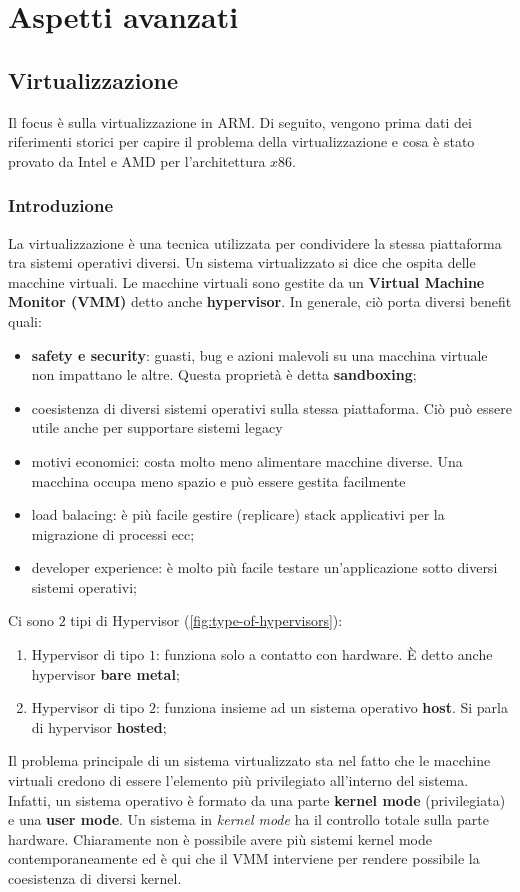 \documentclass{article}
\begin{document}
\clearpage
\section{Aspetti avanzati}
\subsection{Virtualizzazione}\label{sec:virtualization}
Il focus è sulla virtualizzazione in ARM. Di seguito, vengono prima dati dei riferimenti storici per capire il problema della virtualizzazione e cosa è stato provato da Intel e AMD per l'architettura $x86$.
\subsubsection{Introduzione}
La virtualizzazione è una tecnica utilizzata per condividere la stessa piattaforma tra sistemi operativi diversi. Un sistema virtualizzato si dice che ospita delle macchine virtuali. Le macchine virtuali sono gestite da un \textbf{Virtual Machine Monitor (VMM)} detto anche \textbf{hypervisor}.
In generale, ciò porta diversi benefit quali:
\begin{itemize}
  \item \textbf{safety e security}: guasti, bug e azioni malevoli su una macchina virtuale non impattano le altre. Questa proprietà è detta \textbf{sandboxing};
  \item coesistenza di diversi sistemi operativi sulla stessa piattaforma. Ciò può essere utile anche per supportare sistemi legacy
  \item motivi economici: costa molto meno alimentare macchine diverse. Una macchina occupa meno spazio e può essere gestita facilmente
  \item load balacing: è più facile gestire (replicare) stack applicativi per la migrazione di processi ecc; 
  \item developer experience: è molto più facile testare un'applicazione sotto diversi sistemi operativi;
\end{itemize}

Ci sono $2$ tipi di Hypervisor (\cref{fig:type-of-hypervisors}):
\begin{enumerate}
  \item Hypervisor di tipo $1$: funziona solo a contatto con hardware. È detto anche hypervisor \textbf{bare metal};
  \item Hypervisor di tipo $2$: funziona insieme ad un sistema operativo \textbf{host}. Si parla di hypervisor \textbf{hosted};
\end{enumerate}
Il problema principale di un sistema virtualizzato sta nel fatto che le macchine virtuali credono di essere l'elemento più privilegiato all'interno del sistema. Infatti, un sistema operativo è formato da una parte \textbf{kernel mode} (privilegiata) e una \textbf{user mode}. Un sistema in \textit{kernel mode} ha il controllo totale sulla parte hardware. Chiaramente non è possibile avere più sistemi kernel mode contemporaneamente ed è qui che il VMM interviene per rendere possibile la coesistenza di diversi kernel.
\end{document}
